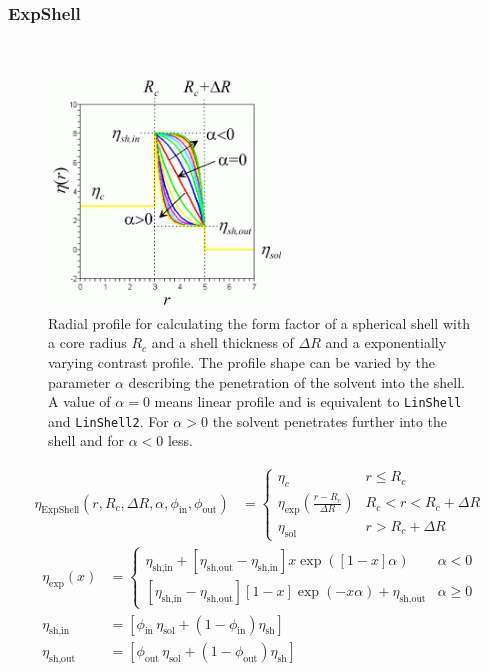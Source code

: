 
\clearpage
\subsubsection{ExpShell}
\label{sect:ExpShell} ~\\

\begin{figure}[htb]
\begin{center}
\includegraphics[width=0.55\textwidth,height=0.5\textwidth]{../images/form_factor/spheres/ExpShell.png}
\end{center}
\caption{Radial profile for calculating the form factor of a spherical shell with a core radius
$R_c$ and a shell thickness of $\Delta R$ and a exponentially varying contrast
profile. The profile shape can be varied by the parameter $\alpha$ describing the penetration of the solvent into the shell.
A value of $\alpha=0$ means linear profile and is equivalent to {\tt LinShell}
and {\tt LinShell2}. For $\alpha>0$ the solvent penetrates further into the shell
and for $\alpha<0$ less.} \label{ExpShellProfile}
\end{figure}

\noindent
\begin{align}
\eta_\text{ExpShell}(r,R_c,\Delta R,\alpha,\phi_\text{in},\phi_\text{out}) &=
\begin{cases}
\eta_c              & r \leq R_c  \\
\eta_\text{exp}(\frac {r-R_c}{\Delta R})   & R_c < r< R_c+\Delta R \\
\eta_\text{sol}     & r> R_c+\Delta R
\end{cases}
\end{align}
\begin{align}
\eta_\text{exp} (x) &=
\begin{cases}
\eta_\text{sh,in}  +
\left[\eta_\text{sh,out}-\eta_\text{sh,in}\right] x \exp\left( \left[ 1-x \right] \alpha\right)
 & \alpha<0 \\[2mm]
\left[\eta_\text{sh,in}-\eta_\text{sh,out}\right] \left[1-x\right] \exp\left(-{x\alpha}\right) +
 \eta_\text{sh,out}& \alpha \geq 0
\end{cases} \\[2mm]
\eta_\text{sh,in} & = \left[ \phi_\text{in}\,\eta_\text{sol}+ \left( 1-\phi_\text{in} \right)
 \eta_\text{sh} \right] \\
\eta_\text{sh,out} & = \left[ \phi_\text{out}\,\eta_\text{sol}+ \left( 1-\phi_\text{out} \right) \eta_\text{sh} \right]
\end{align}

